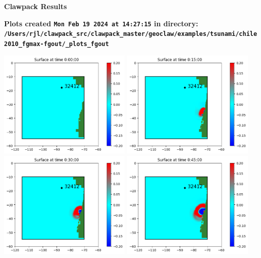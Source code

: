 \documentclass[11pt]{article}
\begin{document}
        \begin{center}{\Large\bf Clawpack Results}\vskip 5pt
        
        \bf Plots created {\tt Mon Feb 19 2024 at 14:27:15} in directory: \vskip 5pt
        \verb+/Users/rjl/clawpack_src/clawpack_master/geoclaw/examples/tsunami/chile2010_fgmax-fgout/_plots_fgout+
        \end{center}
        \vskip 5pt
        \includegraphics[width=0.475\textwidth]{fgout0001frame0001fig0.png}
\vskip 10pt 
\includegraphics[width=0.475\textwidth]{fgout0001frame0002fig0.png}
\vskip 10pt 
\includegraphics[width=0.475\textwidth]{fgout0001frame0003fig0.png}
\vskip 10pt 
\includegraphics[width=0.475\textwidth]{fgout0001frame0004fig0.png}
\end{document}
